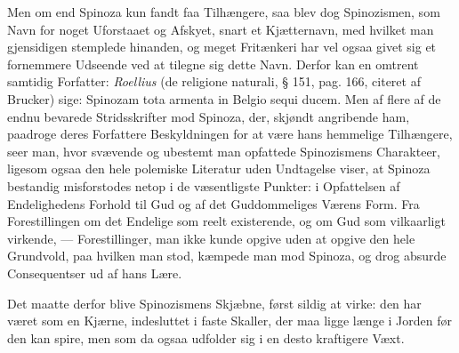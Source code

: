 \documentclass[12pt,a4paper]{book}
\newcommand{\opage}[1]{\marginnote{\footnotesize\textit{[#1]}}}
\begin{document}
Men om end Spinoza kun fandt faa Tilhængere, saa
blev dog Spinozismen, som Navn for noget Uforstaaet og
Afskyet, snart et Kjætternavn, med hvilket man gjensidigen
stemplede hinanden, og meget Fritænkeri har vel ogsaa givet
sig et fornemmere Udseende ved at tilegne sig dette Navn.
Derfor kan en omtrent samtidig Forfatter: \emph{Roellius} (de
religione naturali, § 151, pag. 166, citeret af Brucker)
\opage{183} sige: Spinozam tota armenta in Belgio sequi ducem. Men
af flere af de endnu bevarede Stridsskrifter mod Spinoza,
der, skjøndt angribende ham, paadroge deres Forfattere Beskyldningen
for at være hans hemmelige Tilhængere, seer
man, hvor svævende og ubestemt man opfattede Spinozismens
Charakteer, ligesom ogsaa den hele polemiske Literatur
uden Undtagelse viser, at Spinoza bestandig misforstodes
netop i de væsentligste Punkter: i Opfattelsen af
Endelighedens Forhold til Gud og af det Guddommeliges
Værens Form. Fra Forestillingen om det Endelige som
reelt existerende, og om Gud som vilkaarligt virkende, ---
Forestillinger, man ikke kunde opgive uden at opgive den
hele Grundvold, paa hvilken man stod, kæmpede man mod
Spinoza, og drog absurde Consequentser ud af hans Lære.

Det maatte derfor blive Spinozismens Skjæbne, først
sildig at virke: den har været som en Kjærne, indesluttet i
faste Skaller, der maa ligge længe i Jorden før den kan
spire, men som da ogsaa udfolder sig i en desto kraftigere
Væxt.
\end{document}
